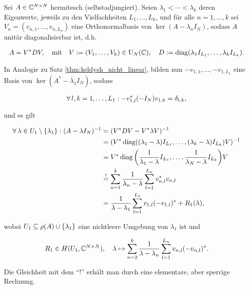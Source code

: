 \begin{remark} \label{keldysh_linear_hermitesch}

    Sei $A \in \mathbb C^{N \times N}$ hermitesch (selbstadjungiert).
    Seien $\lambda_1 < \cdots < \lambda_k$ deren Eigenwerte, jeweils zu den Vielfachheiten $L_1, \dots, L_k$, und für alle $n = 1, \dots, k$ sei $V_n = (v_{n, 1}, \dots, v_{n, L_n})$ eine Orthonormalbasis von $\ker (A - \lambda_n I_N)$, sodass $A$ unitär diagonalisierbar ist, d.h.

    \begin{align*}
        A = V^\ast D V,
        \quad
        \text{mit}
        \quad
        V := (V_1, \dots, V_k) \in \operatorname{U}_N(\mathbb C),
        \quad
        D := \operatorname{diag} (\lambda_1 I_{L_1}, \dots, \lambda_k I_{L_k}).
    \end{align*}

    In Analogie zu Satz \ref{thm:keldysh_nicht_linear}, bilden nun $-v_{1, 1}, \dots, -v_{1, L_1}$ eine Basis von $\ker (A^\ast - \overline \lambda_1 I_N)$, sodass

    \begin{align*}
        \forall \, l, k = 1, \dots, L_1:
            -v_{1, l}^\ast (-I_N) v_{1, k} = \delta_{l, k},
    \end{align*}

    und es gilt

    \begin{align*}
        \forall \, \lambda \in U_1 \setminus {\left \{ \lambda_1 \right \}}:
            (A - \lambda I_N)^{-1}
            & =
            (V^\ast D V - V^\ast \lambda V)^{-1} \\
            & =
            (V^\ast \operatorname{diag} ((\lambda_1 - \lambda) I_{L_1}, \dots, (\lambda_k - \lambda) I_{L_k}) V)^{-1} \\
            & =
            V^\ast \operatorname{diag} {\left ( \frac{1}{\lambda_1 - \lambda} I_{L_1}, \dots, \frac{1}{\lambda_N - \lambda} I_{L_k} \right )} V \\
            & \stackrel{!}{=}
            \sum_{n=1}^k
                \frac{1}{\lambda_n - \lambda}
                \sum_{l=1}^{L_n}
                    v_{n, l}^\ast v_{n, l} \\
            & =
            \frac{1}{\lambda - \lambda_1}
            \sum_{l=1}^{L_1}
                v_{1, l} (-v_{1, l})^\ast
            +
            R_1(\lambda),
    \end{align*}

    wobei $U_1 \subseteq \rho(A) \cup {\left \{ \lambda_1 \right \}}$ eine nichtleere Umgebung von $\lambda_1$ ist und

    \begin{align*}
        R_1 \in H(U_1, \mathbb C^{N \times N}),
        \quad
        \lambda
        \mapsto
        \sum_{n=2}^k
            \frac{1}{\lambda - \lambda_n}
            \sum_{l=1}^{L_n}
                v_{n, l} (-v_{n, l})^\ast.
    \end{align*}

    Die Gleichheit mit dem \enquote{!} erhält man durch eine elementare, aber sperrige Rechnung.

\end{remark}
